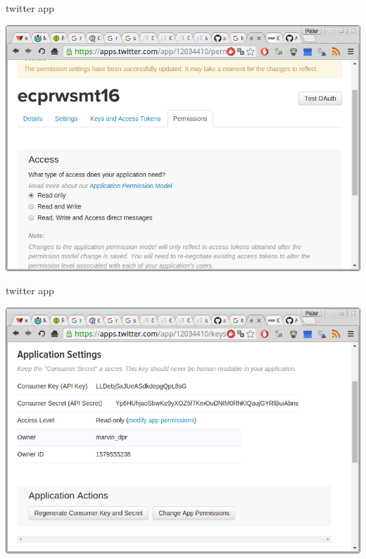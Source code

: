 \documentclass[ignorenonframetext,]{beamer}
\begin{document}
\begin{frame}{twitter app}

\includegraphics{fig/twitterapp5.png}

\end{frame}

\begin{frame}{twitter app}

\includegraphics{fig/twitterapp6.png}

\end{frame}
\end{document}

